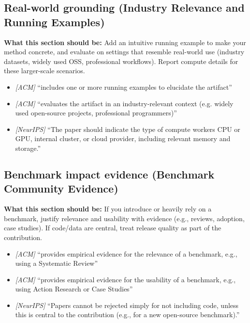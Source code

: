 \documentclass[11pt]{article}
\begin{document}
\subsection{Real-world grounding (Industry Relevance and Running Examples)}
\noindent\textbf{What this section should be:}
Add an intuitive running example to make your method concrete, and evaluate on settings that resemble real-world use (industry datasets, widely used OSS, professional workflows). Report compute details for these larger-scale scenarios.
\begin{itemize}
  \item \textit{[ACM]} ``includes one or more running examples to elucidate the artifact''
  \item \textit{[ACM]} ``evaluates the artifact in an industry-relevant context (e.g. widely used open-source projects, professional programmers)''
  \item \textit{[NeurIPS]} ``The paper should indicate the type of compute workers CPU or GPU, internal cluster, or cloud provider, including relevant memory and storage.''
\end{itemize}

\subsection{Benchmark impact evidence (Benchmark Community Evidence)}
\noindent\textbf{What this section should be:}
If you introduce or heavily rely on a benchmark, justify relevance and usability with evidence (e.g., reviews, adoption, case studies). If code/data are central, treat release quality as part of the contribution.
\begin{itemize}
  \item \textit{[ACM]} ``provides empirical evidence for the relevance of a benchmark, e.g., using a Systematic Review''
  \item \textit{[ACM]} ``provides empirical evidence for the usability of a benchmark, e.g., using Action Research or Case Studies''
  \item \textit{[NeurIPS]} ``Papers cannot be rejected simply for not including code, unless this is central to the contribution (e.g., for a new open-source benchmark).''
\end{itemize}
\end{document}

